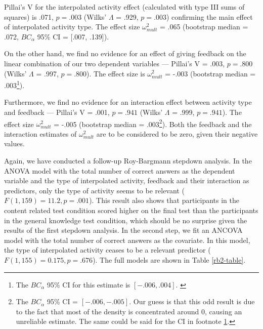\documentclass[../main.tex]{subfiles}
\begin{document}
Pillai's V for the interpolated activity effect (calculated with type
III sums of squares) is .071, \(p = .003\) (Wilks' \(\Lambda\) = .929,
\(p = .003\)) confirming the main effect of interpolated activity type.
The effect size \(\omega^2_{mult}\) = .065 (bootstrap median = .072,
\(BC_\alpha\) 95\% CI = {[}.007, .139{]}).

On the other hand, we find no evidence for an effect of giving feedback
on the linear combination of our two dependent variables --- Pillai's V
= .003, \(p = .800\) (Wilks' \(\Lambda\) = .997, \(p = .800\)). The
effect size is \(\omega^2_{mult}\) = -.003 (bootstrap median =
.003\footnote{
The \(BC_\alpha\) 95\% CI for this estimate is \([-.006,
.004]\).
\label{bca-ref}}).

Furthermore, we find no evidence for an interaction effect between
activity type and feedback --- Pillai's V = .001, \(p = .941\) (Wilks'
\(\Lambda\) = .999, \(p = .941\)). The effect size \(\omega^2_{mult}\) =
-.005 (bootstrap median = .003\footnote{
The \(BC_\alpha\) 95\% CI = \([-.006,
-.005]\).
Our guess is that this odd result is due to the fact that most of the density is concentrated
around 0, causing an unreliable estimate. The same could be said for the CI in
footnote \ref{bca-ref}.}). Both the feedback and the interaction
estimates of \(\omega^2_{mult}\) are to be considered to be zero, given
their negative values.

Again, we have conducted a follow-up Roy-Bargmann stepdown analysis. In
the ANOVA model with the total number of correct answers as the
dependent variable and the type of interpolated activity, feedback and
their interaction as predictors, only the type of activity seems to be
relevant (\(F(1, 159) = 11.2, p = .001\)). This result also shows that
participants in the content related test condition scored higher on the
final test than the participants in the general knowledge test
condition, which should be no surprise given the results of the first
stepdown analysis. In the second step, we fit an ANCOVA model with the
total number of correct answers as the covariate. In this model, the
type of interpolated activity ceases to be a relevant predictor
(\(F(1, 155) = 0.175, p = .676\)). The full models are shown in Table
\ref{rb2-table}.
\end{document}
